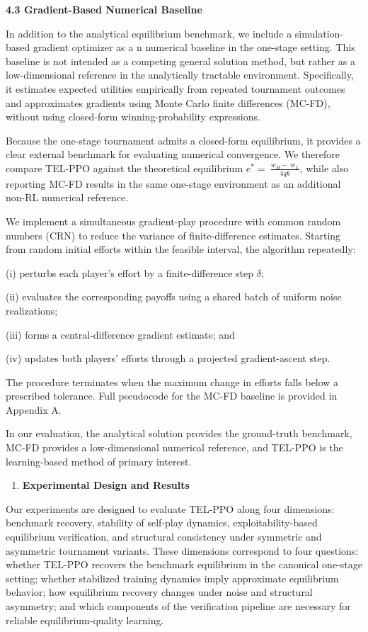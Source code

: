\documentclass[
]{article}
\begin{document}
\textbf{4.3 Gradient-Based Numerical Baseline}

In addition to the analytical equilibrium benchmark, we include a
simulation-based gradient optimizer as a n numerical baseline in the
one-stage setting. This baseline is not intended as a competing general
solution method, but rather as a low-dimensional reference in the
analytically tractable environment. Specifically, it estimates expected
utilities empirically from repeated tournament outcomes and approximates
gradients using Monte Carlo finite differences (MC-FD), without using
closed-form winning-probability expressions.

Because the one-stage tournament admits a closed-form equilibrium, it
provides a clear external benchmark for evaluating numerical
convergence. We therefore compare TEL-PPO against the theoretical
equilibrium \(e^{*} = \ \frac{w_{H} - \ w_{L}}{4qk}\), while also
reporting MC-FD results in the same one-stage environment as an
additional non-RL numerical reference.

We implement a simultaneous gradient-play procedure with common random
numbers (CRN) to reduce the variance of finite-difference estimates.
Starting from random initial efforts within the feasible interval, the
algorithm repeatedly:

(i) perturbs each player's effort by a finite-difference step
\(\delta\);

(ii) evaluates the corresponding payoffs using a shared batch of uniform
noise realizations;

(iii) forms a central-difference gradient estimate; and

(iv) updates both players' efforts through a projected gradient-ascent
step.

The procedure terminates when the maximum change in efforts falls below
a prescribed tolerance. Full pseudocode for the MC-FD baseline is
provided in Appendix A.

In our evaluation, the analytical solution provides the ground-truth
benchmark, MC-FD provides a low-dimensional numerical reference, and
TEL-PPO is the learning-based method of primary interest.

\begin{enumerate}
\def\labelenumi{\arabic{enumi}.}
\setcounter{enumi}{4}
\item
  \textbf{Experimental Design and Results}
\end{enumerate}

Our experiments are designed to evaluate TEL-PPO along four dimensions:
benchmark recovery, stability of self-play dynamics,
exploitability-based equilibrium verification, and structural
consistency under symmetric and asymmetric tournament variants. These
dimensions correspond to four questions: whether TEL-PPO recovers the
benchmark equilibrium in the canonical one-stage setting; whether
stabilized training dynamics imply approximate equilibrium behavior; how
equilibrium recovery changes under noise and structural asymmetry; and
which components of the verification pipeline are necessary for reliable
equilibrium-quality learning.
\end{document}
